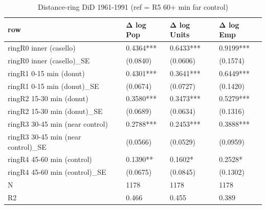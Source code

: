 \begin{table}

\caption{Distance-ring DiD 1961-1991 (ref = R5 60+ min far control)}
\centering
\begin{tabular}[t]{llll}
\toprule
row & Δ log Pop & Δ log Units & Δ log Emp\\
\midrule
ringR0 inner (casello) & 0.4364*** & 0.6433*** & 0.9199***\\
ringR0 inner (casello)\_SE & (0.0840) & (0.0606) & (0.1574)\\
ringR1 0-15 min (donut) & 0.4301*** & 0.3641*** & 0.6449***\\
ringR1 0-15 min (donut)\_SE & (0.0674) & (0.0727) & (0.1420)\\
ringR2 15-30 min (donut) & 0.3580*** & 0.3473*** & 0.5279***\\
\addlinespace
ringR2 15-30 min (donut)\_SE & (0.0689) & (0.0634) & (0.1316)\\
ringR3 30-45 min (near control) & 0.2788*** & 0.2453*** & 0.3888***\\
ringR3 30-45 min (near control)\_SE & (0.0566) & (0.0529) & (0.0959)\\
ringR4 45-60 min (control) & 0.1390** & 0.1602* & 0.2528*\\
ringR4 45-60 min (control)\_SE & (0.0675) & (0.0845) & (0.1302)\\
\addlinespace
N & 1178 & 1178 & 1178\\
R2 & 0.466 & 0.455 & 0.389\\
\bottomrule
\end{tabular}
\end{table}
